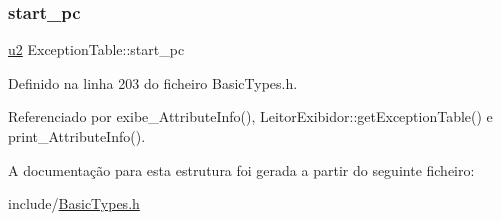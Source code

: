 \subsubsection{\texorpdfstring{start\+\_\+pc}{start\_pc}}
{\footnotesize\ttfamily \hyperlink{BasicTypes_8h_a732cde1300aafb73b0ea6c2558a7a54f}{u2} Exception\+Table\+::start\+\_\+pc}



Definido na linha 203 do ficheiro Basic\+Types.\+h.



Referenciado por exibe\+\_\+\+Attribute\+Info(), Leitor\+Exibidor\+::get\+Exception\+Table() e print\+\_\+\+Attribute\+Info().



A documentação para esta estrutura foi gerada a partir do seguinte ficheiro\+:\begin{DoxyCompactItemize}
\item 
include/\hyperlink{BasicTypes_8h}{Basic\+Types.\+h}\end{DoxyCompactItemize}
